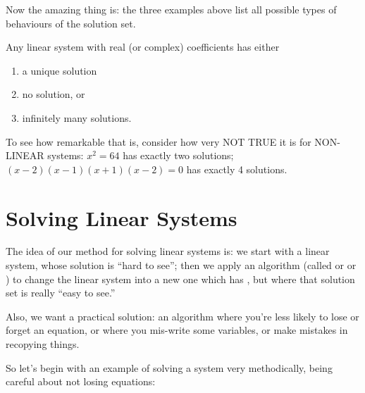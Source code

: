 
Now the amazing thing is:  the three examples above list all possible types
of behaviours of the solution set.

\begin{theorem}
Any linear system with real (or complex) coefficients has either
\begin{enumerate}
\item a unique solution
\item no solution, or
\item infinitely many solutions.
\end{enumerate}
\end{theorem}

To see how remarkable that is, consider how very NOT TRUE it is for NON-LINEAR systems:
$x^2=64$ has exactly two solutions; $(x-2)(x-1)(x+1)(x-2)=0$ has exactly 4 solutions.


\section{Solving Linear Systems}

The idea of our method for solving linear systems is:  we start with
a linear system, whose solution is ``hard to see''; then we apply
an algorithm (called  or  or
)
to change the linear system into a new one which has , but where that solution set is  really ``easy to see.''

Also, we want a practical solution:  an algorithm where you're less
likely to lose or forget an equation, or where you mis-write some
variables, or make mistakes in recopying things.  

So let's begin with an example of solving a system very methodically,
being careful about not losing equations:

